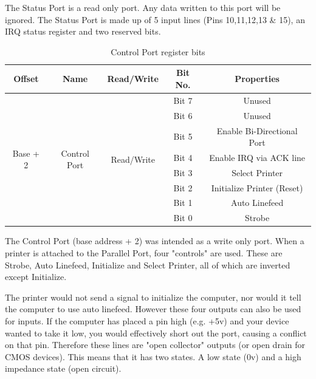 \documentclass[a4paper,28pt,twoside,openright]{report}
\begin{document}
The Status Port is a read only port. Any data written to this port will be ignored. The Status Port is made up of 5 input lines (Pins 10,11,12,13 \& 15), an IRQ status register and two reserved bits.
\begin{table}[]
\centering
\bgroup
\def\arraystretch{1.5}
\begin{tabular}{|c|c|c|c|c|}
\hline
\textbf{Offset}           & \textbf{Name}                 & \textbf{Read/Write}         & \textbf{Bit No.} & \textbf{Properties}        \\ \hline
\multirow{8}{*}{Base + 2} & \multirow{8}{*}{Control Port} & \multirow{8}{*}{Read/Write} & Bit 7            & Unused                     \\ \cline{4-5} 
                          &                               &                             & Bit 6            & Unused                     \\ \cline{4-5} 
                          &                               &                             & Bit 5            & Enable Bi-Directional Port \\ \cline{4-5} 
                          &                               &                             & Bit 4            & Enable IRQ via ACK line    \\ \cline{4-5} 
                          &                               &                             & Bit 3            & Select Printer             \\ \cline{4-5} 
                          &                               &                             & Bit 2            & Initialize Printer (Reset) \\ \cline{4-5} 
                          &                               &                             & Bit 1            & Auto Linefeed              \\ \cline{4-5} 
                          &                               &                             & Bit 0            & Strobe                     \\ \hline
\end{tabular}
\caption{Control Port register bits}
\egroup
\end{table}

The Control Port (base address + 2) was intended as a write only port. When a printer is attached to the Parallel Port, four "controls" are used. These are Strobe, Auto Linefeed, Initialize and Select Printer, all of which are inverted
except Initialize.

The printer would not send a signal to initialize the computer, nor would it tell the computer to use auto linefeed. However these four outputs can also be used for inputs. If the computer has placed a pin high (e.g. +5v) and your device wanted to take it low, you would effectively short out the port, causing a conflict on that pin. Therefore these lines are "open collector" outputs (or open drain for CMOS devices). This means that it has two states. A low state (0v) and a high impedance state (open circuit).
\end{document}
